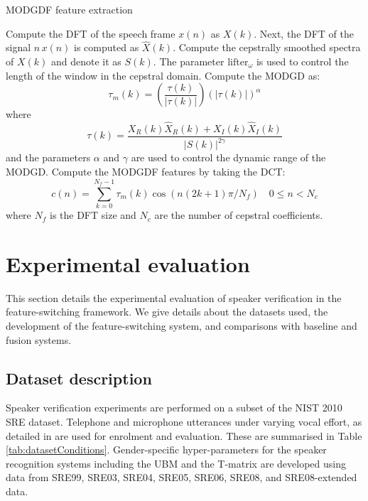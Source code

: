 \documentclass{article}
\begin{document}
\begin{algorithm}[!th]
\caption{MODGDF feature extraction}
\label{algo:modgd}
\begin{algorithmic}[1]

\STATE {}
\STATE Compute the DFT of the speech frame $x(n)$ as $X(k)$.
\STATE Next, the DFT of the signal $n\,x(n)$ is computed as $\hat{X}(k)$.
\STATE Compute the cepstrally smoothed spectra of $X(k)$ and denote it as
$S(k)$. The parameter $\textrm{lifter}_\omega$ is used to control the length of
the window in the cepstral domain. 
\STATE Compute the MODGD as:
\begin{equation*}
\tau_m(k) = \left(\frac{\tau(k)}{|\tau(k)|}\right) (|\tau(k)|)^\alpha
\end{equation*}
where
\begin{equation*}
\tau(k) = \frac{X_R(k)\hat{X}_R(k)+X_I(k)\hat{X}_I(k)}{|S(k)|^{2\gamma}}
\end{equation*}
and the parameters $\alpha$ and $\gamma$ are used to control the dynamic range
of the MODGD. 
\STATE Compute the MODGDF features by taking the DCT:
\begin{equation*}
c(n) = \sum_{k=0}^{N_f-1}\tau_m(k)\cos(n(2k+1)\pi/N_f) \quad 0 \leq n < N_c
\end{equation*}
where $N_f$ is the DFT size and $N_c$ are the number of cepstral coefficients. 

\end{algorithmic}
\end{algorithm}

\section{Experimental evaluation}
\label{sec:expts}
This section details the experimental evaluation of speaker verification in the
feature-switching framework. We give details about the datasets used, the
development of the feature-switching system, and comparisons with baseline and
fusion systems.

\subsection{Dataset description}
\label{sec:dB}
Speaker verification experiments are performed on a subset of
the NIST 2010 SRE dataset. Telephone and microphone utterances under varying 
vocal effort, as detailed in \cite{nist2010SRE} are used for enrolment and 
evaluation. These are summarised in Table \ref{tab:datasetConditions}. 
Gender-specific hyper-parameters for the speaker recognition systems including 
the UBM and the T-matrix are developed using data 
from SRE99, SRE03, SRE04, SRE05, SRE06, SRE08, and SRE08-extended data.
\end{document}
